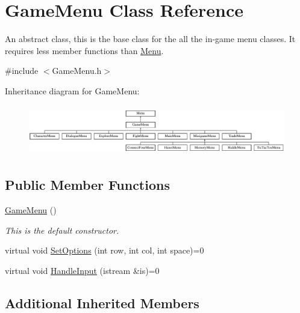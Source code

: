 \hypertarget{classGameMenu}{\section{Game\-Menu Class Reference}
\label{classGameMenu}
}


An abstract class, this is the base class for the all the in-\/game menu classes. It requires less member functions than \hyperlink{classMenu}{Menu}.  




{\ttfamily \#include $<$Game\-Menu.\-h$>$}

Inheritance diagram for Game\-Menu\-:\begin{figure}[H]
\begin{center}
\leavevmode
\includegraphics[height=2.222222cm]{classGameMenu}
\end{center}
\end{figure}
\subsection*{Public Member Functions}
\begin{DoxyCompactItemize}
\item 
\hypertarget{classGameMenu_ae31c50148abf655297a2a3eab53c15a3}{\hyperlink{classGameMenu_ae31c50148abf655297a2a3eab53c15a3}{Game\-Menu} ()}\label{classGameMenu_ae31c50148abf655297a2a3eab53c15a3}

\begin{DoxyCompactList}\small\item\em This is the default constructor. \end{DoxyCompactList}\item 
virtual void \hyperlink{classGameMenu_ac32ff465c5a4f30979e8851fa21cb230}{Set\-Options} (int row, int col, int space)=0
\item 
virtual void \hyperlink{classGameMenu_a02ba09feedece5773f44ba865ccffb42}{Handle\-Input} (istream \&is)=0
\end{DoxyCompactItemize}
\subsection*{Additional Inherited Members}


